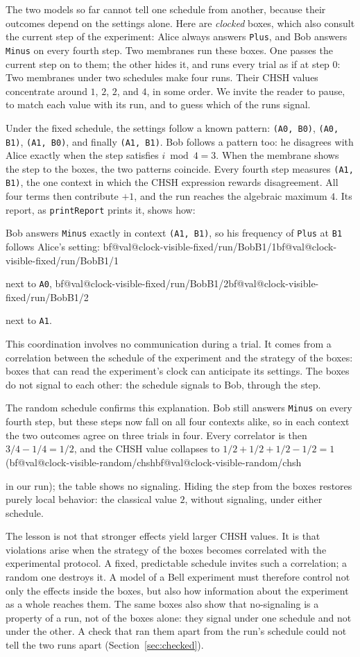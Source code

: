 \documentclass[11pt]{article}
\makeatletter
\newcommand{\codesize}{\fontsize{9.5}{11.4}\selectfont}
\newcommand{\hs}{\lstinline[style=hask,basicstyle=\ttfamily,frame=none]}
\newcommand{\printedreport}[1]{\par\vspace{3pt}\noindent\begin{minipage}{\linewidth}%
  \VerbatimInput[fontfamily=iosout, fontsize=\codesize, frame=leftline, framerule=1.2pt,
    rulecolor=\color{BlockTeal}, xleftmargin=12pt, framesep=7pt]{generated/report-#1.txt}%
  \end{minipage}\par\vspace{3pt}}
\newcommand{\val}[1]{\ifcsname bf@val@#1\endcsname\csname bf@val@#1\endcsname
  \else\PackageError{paper}{No value #1 in generated/values.tex}{}\fi}
\newcommand{\pausehere}{\begin{center}\small\textcolor{TextGray}{\ding{167}\quad\ding{167}}\end{center}}
\makeatother
\begin{document}
The two models so far cannot tell one schedule from another, because their outcomes depend on the settings alone. Here are \emph{clocked} boxes, which also consult the current step of the experiment:
Alice always answers \hs|Plus|, and Bob answers \hs|Minus| on every fourth step. Two membranes run these boxes. One passes the current step on to them; the other hides it, and runs every trial as if at step $0$:
Two membranes under two schedules make four runs. Their CHSH values concentrate around $1$, $2$, $2$, and $4$, in some order. We invite the reader to pause, to match each value with its run, and to guess which of the runs signal.

\pausehere

Under the fixed schedule, the settings follow a known pattern: \hs|(A0, B0)|, \hs|(A0, B1)|, \hs|(A1, B0)|, and finally \hs|(A1, B1)|. Bob follows a pattern too: he disagrees with Alice exactly when the step satisfies $i \bmod 4 = 3$. When the membrane shows the step to the boxes, the two patterns coincide. Every fourth step measures \hs|(A1, B1)|, the one context in which the CHSH expression rewards disagreement. All four terms then contribute $+1$, and the run reaches the algebraic maximum $4$. Its report, as \hs|printReport| prints it, shows how:
\printedreport{clock-visible-fixed}
Bob answers \hs|Minus| exactly in context \hs|(A1, B1)|, so his frequency of \hs|Plus| at \hs|B1| follows Alice's setting: \val{clock-visible-fixed/run/BobB1/1} next to \hs|A0|, \val{clock-visible-fixed/run/BobB1/2} next to \hs|A1|.

This coordination involves no communication during a trial. It comes from a correlation between the schedule of the experiment and the strategy of the boxes: boxes that can read the experiment's clock can anticipate its settings. The boxes do not signal to each other: the schedule signals to Bob, through the step.

The random schedule confirms this explanation. Bob still answers \hs|Minus| on every fourth step, but these steps now fall on all four contexts alike, so in each context the two outcomes agree on three trials in four. Every correlator is then $3/4 - 1/4 = 1/2$, and the CHSH value collapses to $1/2 + 1/2 + 1/2 - 1/2 = 1$ (\val{clock-visible-random/chsh} in our run); the table shows no signaling. Hiding the step from the boxes restores purely local behavior: the classical value $2$, without signaling, under either schedule.

The lesson is not that stronger effects yield larger CHSH values. It is that violations arise when the strategy of the boxes becomes correlated with the experimental protocol. A fixed, predictable schedule invites such a correlation; a random one destroys it. A model of a Bell experiment must therefore control not only the effects inside the boxes, but also how information about the experiment as a whole reaches them. The same boxes also show that no-signaling is a property of a run, not of the boxes alone: they signal under one schedule and not under the other. A check that ran them apart from the run's schedule could not tell the two runs apart (Section~\ref{sec:checked}).
\end{document}

